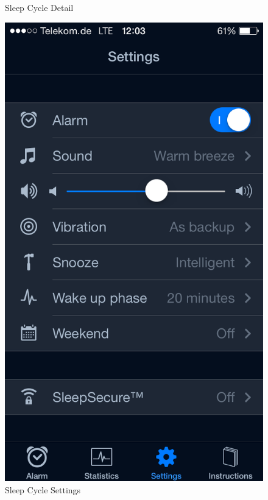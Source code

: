\begin{figure}[htbp]
\begin{minipage}[b]{0.47\textwidth}
    \caption{Sleep Cycle Detail}
    \label{fig:SCDetail}
  \end{minipage}
  \begin{minipage}[b]{0.47\textwidth}
    \centering
    \includegraphics[scale=0.3]{images/SleepCycle/Settings1}  
    \caption{Sleep Cycle Settings}
    \label{fig:SCSettings}
  \end{minipage}
\end{figure}

